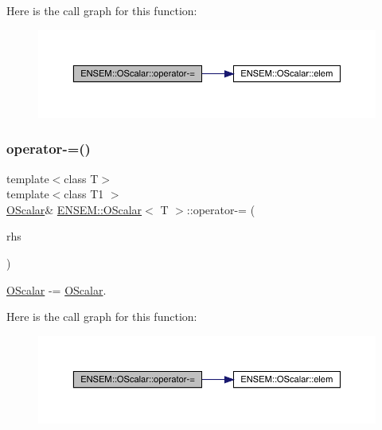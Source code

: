 Here is the call graph for this function\+:
\nopagebreak
\begin{figure}[H]
\begin{center}
\leavevmode
\includegraphics[width=350pt]{da/d80/classENSEM_1_1OScalar_a4d240e95768b5a0c9537b32d00d60ac5_cgraph}
\end{center}
\end{figure}
\mbox{\label{classENSEM_1_1OScalar_a4d240e95768b5a0c9537b32d00d60ac5}} 
\subsubsection{\texorpdfstring{operator-\/=()}{operator-=()}\hspace{0.1cm}{\footnotesize\ttfamily [3/3]}}
{\footnotesize\ttfamily template$<$class T$>$ \\
template$<$class T1 $>$ \\
\mbox{\hyperlink{classENSEM_1_1OScalar}{O\+Scalar}}\& \mbox{\hyperlink{classENSEM_1_1OScalar}{E\+N\+S\+E\+M\+::\+O\+Scalar}}$<$ T $>$\+::operator-\/= (\begin{DoxyParamCaption}\item[{const \mbox{\hyperlink{classENSEM_1_1OScalar}{O\+Scalar}}$<$ T1 $>$ \&}]{rhs }\end{DoxyParamCaption})\hspace{0.3cm}{\ttfamily [inline]}}



\mbox{\hyperlink{classENSEM_1_1OScalar}{O\+Scalar}} -\/= \mbox{\hyperlink{classENSEM_1_1OScalar}{O\+Scalar}}. 

Here is the call graph for this function\+:
\nopagebreak
\begin{figure}[H]
\begin{center}
\leavevmode
\includegraphics[width=350pt]{da/d80/classENSEM_1_1OScalar_a4d240e95768b5a0c9537b32d00d60ac5_cgraph}
\end{center}
\end{figure}
\mbox{\label{classENSEM_1_1OScalar_a1e0517e29754a8acb284c3ac266c2b2c}} 
